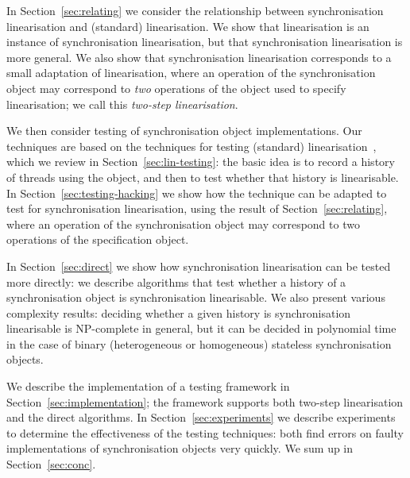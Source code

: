 In Section~\ref{sec:relating} we consider the relationship between
synchronisation linearisation and (standard) linearisation.  We show that
linearisation is an instance of synchronisation linearisation, but that
synchronisation linearisation is more general.  We also show that
synchronisation linearisation corresponds to a small adaptation of
linearisation, where an operation of the synchronisation object may correspond
to \emph{two} operations of the object used to specify linearisation; we call
this \emph{two-step linearisation}.

We then consider testing of synchronisation object implementations.  Our
techniques are based on the techniques for testing (standard)
linearisation~\cite{gavin:lin-testing}, which we review in
Section~\ref{sec:lin-testing}: the basic idea is to record a history of
threads using the object, and then to test whether that history is
linearisable.
%
In Section~\ref{sec:testing-hacking} we show how the technique can be adapted
to test for synchronisation linearisation, using the result of
Section~\ref{sec:relating}, where an operation of the synchronisation object
may correspond to two operations of the specification object.  

In Section~\ref{sec:direct} we show how synchronisation linearisation can be
tested more directly: we describe algorithms that test whether a history of a
synchronisation object is synchronisation linearisable.  We also present
various complexity results: deciding whether a given history is
synchronisation linearisable is NP-complete in general, but it can be decided
in polynomial time in the case of binary (heterogeneous or homogeneous)
stateless synchronisation objects.  


We describe the implementation of a testing framework in
Section~\ref{sec:implementation}; the framework supports both two-step
linearisation and the direct algorithms.  In Section~\ref{sec:experiments} we
describe experiments to determine the effectiveness of the testing techniques:
both find errors on faulty implementations of synchronisation objects very
quickly.  We sum up in Section~\ref{sec:conc}.

